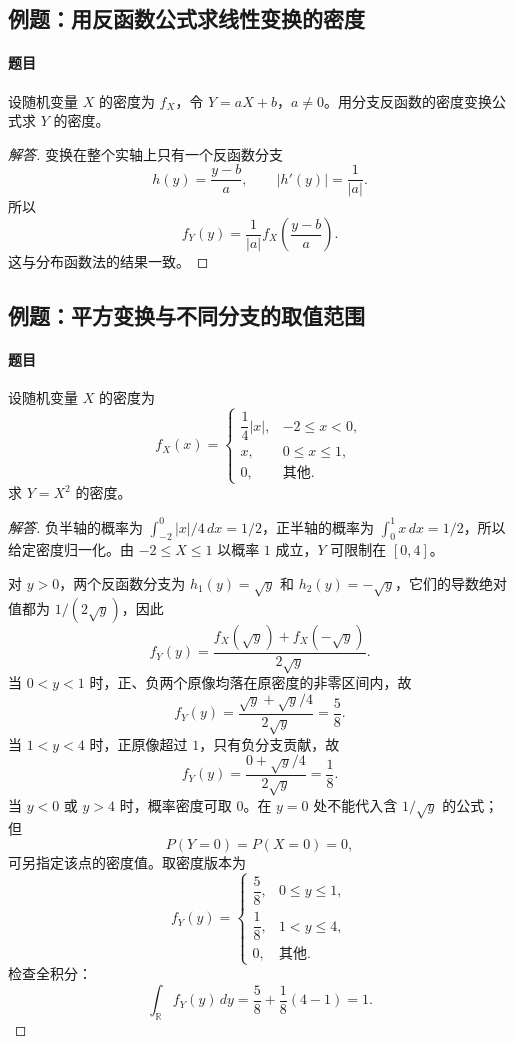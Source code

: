 \subsection{例题：用反函数公式求线性变换的密度}\label{note:c2:e22}
\paragraph{题目}
设随机变量 $X$ 的密度为 $f_X$，令 $Y=aX+b$，$a\ne0$。用分支反函数的密度变换公式求 $Y$ 的密度。

\begin{proof}[解答]
变换在整个实轴上只有一个反函数分支
\[
h(y)=\frac{y-b}{a},\qquad |h'(y)|=\frac1{|a|}.
\]
所以
\[
f_Y(y)=\frac1{|a|}f_X\left(\frac{y-b}{a}\right).
\]
这与分布函数法的结果一致。
\end{proof}

\subsection{例题：平方变换与不同分支的取值范围}\label{note:c2:e23}
\paragraph{题目}
设随机变量 $X$ 的密度为
\[
f_X(x)=
\begin{cases}
\dfrac14|x|,&-2\leq x<0,\\
x,&0\leq x\leq1,\\
0,&\text{其他}.
\end{cases}
\]
求 $Y=X^2$ 的密度。

\begin{proof}[解答]
负半轴的概率为 $\int_{-2}^0|x|/4\,dx=1/2$，正半轴的概率为 $\int_0^1x\,dx=1/2$，所以给定密度归一化。由 $-2\leq X\leq1$ 以概率 $1$ 成立，$Y$ 可限制在 $[0,4]$。

对 $y>0$，两个反函数分支为 $h_1(y)=\sqrt y$ 和 $h_2(y)=-\sqrt y$，它们的导数绝对值都为 $1/(2\sqrt y)$，因此
\[
f_Y(y)=\frac{f_X(\sqrt y)+f_X(-\sqrt y)}{2\sqrt y}.
\]
当 $0<y<1$ 时，正、负两个原像均落在原密度的非零区间内，故
\[
f_Y(y)=\frac{\sqrt y+\sqrt y/4}{2\sqrt y}=\frac58.
\]
当 $1<y<4$ 时，正原像超过 $1$，只有负分支贡献，故
\[
f_Y(y)=\frac{0+\sqrt y/4}{2\sqrt y}=\frac18.
\]
当 $y<0$ 或 $y>4$ 时，概率密度可取 $0$。在 $y=0$ 处不能代入含 $1/\sqrt y$ 的公式；但
\[
P(Y=0)=P(X=0)=0,
\]
可另指定该点的密度值。取密度版本为
\[
f_Y(y)=
\begin{cases}
\dfrac58,&0\leq y\leq1,\\
\dfrac18,&1<y\leq4,\\
0,&\text{其他}.
\end{cases}
\]
检查全积分：
\[
\int_{\mathbb R}f_Y(y)\,dy=\frac58+\frac18(4-1)=1.
\]
\end{proof}

